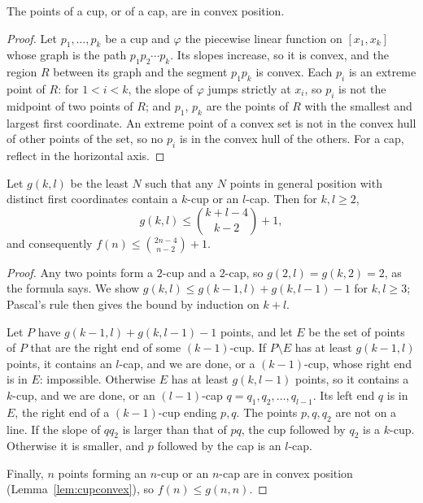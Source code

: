 \begin{lemma}\label{lem:cupconvex}
The points of a cup, or of a cap, are in convex position.
\end{lemma}
\begin{proof}
Let $p_1,\dots,p_k$ be a cup and $\varphi$ the piecewise linear function on $[x_1,x_k]$ whose graph is the path $p_1p_2\cdots p_k$. Its slopes increase,
so it is convex, and the region $R$ between its graph and the segment $p_1p_k$ is convex. Each $p_i$ is an extreme point of $R$: for $1<i<k$, the slope of
$\varphi$ jumps strictly at $x_i$, so $p_i$ is not the midpoint of two points of $R$; and $p_1$, $p_k$ are the points of $R$ with the smallest and
largest first coordinate. An extreme point of a convex set is not in the convex hull of other points of the set, so no $p_i$ is in the convex hull of
the others. For a cap, reflect in the horizontal axis.
\end{proof}

\begin{theorem}\label{thm:cupcap}
Let $g(k,l)$ be the least $N$ such that any $N$ points in general position with distinct first coordinates contain a $k$-cup or an $l$-cap. Then for
$k,l\ge2$,
\[
g(k,l)\le\binom{k+l-4}{k-2}+1,
\]
and consequently $f(n)\le\binom{2n-4}{n-2}+1$.
\end{theorem}
\begin{proof}
Any two points form a $2$-cup and a $2$-cap, so $g(2,l)=g(k,2)=2$, as the formula says. We show $g(k,l)\le g(k-1,l)+g(k,l-1)-1$ for $k,l\ge3$;
Pascal's rule then gives the bound by induction on $k+l$.

Let $P$ have $g(k-1,l)+g(k,l-1)-1$ points, and let $E$ be the set of points of $P$ that are the right end of some $(k-1)$-cup. If $P\setminus E$ has at
least $g(k-1,l)$ points, it contains an $l$-cap, and we are done, or a $(k-1)$-cup, whose right end is in $E$: impossible. Otherwise $E$ has at least
$g(k,l-1)$ points, so it contains a $k$-cup, and we are done, or an $(l-1)$-cap $q=q_1,q_2,\dots,q_{l-1}$. Its left end $q$ is in $E$, the right end of a
$(k-1)$-cup ending $p,q$. The points $p,q,q_2$ are not on a line. If the slope of $qq_2$ is larger than that of $pq$, the cup followed by $q_2$ is a
$k$-cup. Otherwise it is smaller, and $p$ followed by the cap is an $l$-cap.

Finally, $n$ points forming an $n$-cup or an $n$-cap are in convex position (Lemma~\ref{lem:cupconvex}), so $f(n)\le g(n,n)$.
\end{proof}

